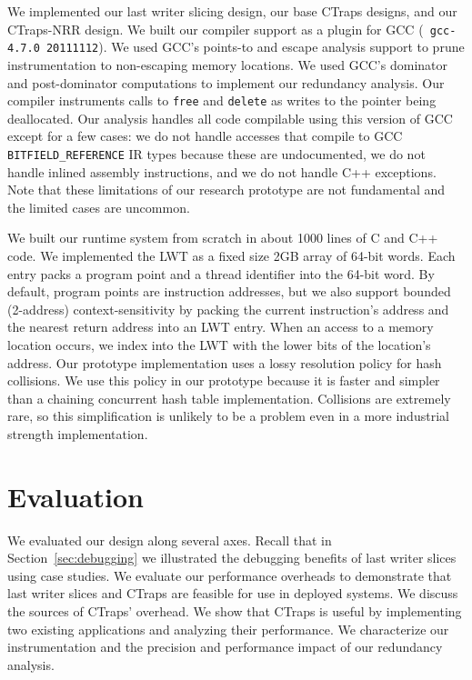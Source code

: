 \documentclass[preprint,9pt]{sigplanconf}
\newcommand{\ctraps}{CTraps\xspace}
\newcommand{\ctrapsmm}{CTraps-NRR\xspace}
\begin{document}
We implemented our last writer slicing design, our base \ctraps designs, and
our \ctrapsmm design.  We built our compiler support as a plugin for GCC ({\tt
gcc-4.7.0 20111112}).  We used GCC's points-to and escape analysis support to
prune instrumentation to non-escaping memory locations.  We used GCC's
dominator and post-dominator computations to implement our redundancy analysis.
Our compiler instruments calls to {\tt free} and {\tt delete} as writes to the
pointer being deallocated.  Our analysis handles all code compilable using this
version of GCC except for a few cases: we do not handle accesses that compile
to GCC {\tt BITFIELD\_REFERENCE} IR types because these are undocumented, we do
not handle inlined assembly instructions, and we do not handle C++ exceptions.
Note that these limitations of our research prototype are not fundamental and
the limited cases are uncommon.   

We built our runtime system from scratch in about 1000 lines of C and C++ code.
We implemented the LWT as a fixed size 2GB array of 64-bit words.  Each entry
packs a program point and a thread identifier into the 64-bit word.  By
default, program points are instruction addresses, but we also support bounded
(2-address) context-sensitivity by packing the current instruction's address
and the nearest return address into an LWT entry. When an access to a memory
location occurs, we index into the LWT with the lower bits of the location's
address.  Our prototype implementation uses a lossy resolution policy for hash
collisions.  We use this policy in our prototype because it is faster and
simpler than a chaining concurrent hash table implementation.  Collisions are
extremely rare, so this simplification is unlikely to be a problem even in a
more industrial strength implementation.  




\section{Evaluation}
\label{sec:eval}
We evaluated our design along several axes. Recall that in
Section~\ref{sec:debugging} we illustrated the debugging benefits of last
writer slices using case studies.   We evaluate our performance overheads to
demonstrate that last writer slices and \ctraps are feasible for use in
deployed systems.  We discuss the sources of \ctraps' overhead.   We show that
\ctraps is useful by implementing two existing applications and analyzing their
performance.  We characterize our instrumentation and the precision and
performance impact of our redundancy analysis.  
\end{document}
